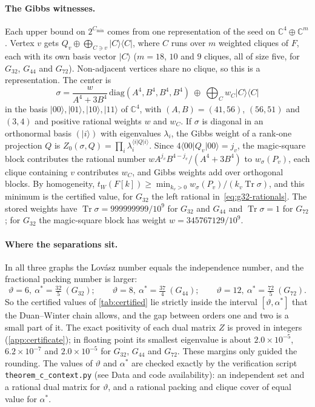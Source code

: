 \documentclass[11pt]{article}
\theoremstyle{definition}
\DeclareMathOperator{\Tr}{Tr}
\newcommand{\vt}{\vartheta}
\newcommand{\Cmin}{C_{\min}}
\newcommand{\ket}[1]{\lvert #1\rangle}
\newcommand{\bra}[1]{\langle #1\rvert}
\newcommand{\proj}[1]{\ket{#1}\!\bra{#1}}
\begin{document}
\paragraph{The Gibbs witnesses.}
Each upper bound on $2^{\Cmin}$ comes from one representation of the seed on
$\mathbb C^4\oplus\mathbb C^m$.  Vertex $v$ gets
$Q_v\oplus\bigoplus_{C\ni v}\proj C$, where $C$ runs over $m$ weighted
cliques of $F$, each with its own basis vector $\ket C$ ($m=18$, $10$ and $9$
cliques, all of size five, for $G_{32}$, $G_{44}$ and $G_{72}$).
Non-adjacent vertices share no clique, so this is a representation.  The
center is
\[
 \sigma=\frac{w}{A^4+3B^4}\,\mathrm{diag}(A^4,B^4,B^4,B^4)\ \oplus\
 \bigoplus_Cw_C\proj C
\]
in the basis $\ket{00},\ket{01},\ket{10},\ket{11}$ of $\mathbb C^4$, with
$(A,B)=(41,56)$, $(56,51)$ and $(3,4)$ and positive rational weights $w$ and
$w_C$.  If $\sigma$ is diagonal in an orthonormal basis $(\ket i)$ with
eigenvalues $\lambda_i$, the Gibbs weight of a rank-one projection $Q$ is
$Z_0(\sigma,Q)=\prod_i\lambda_i^{\bra iQ\ket i}$.  Since
$4\bra{00}Q_v\ket{00}=j_v$, the magic-square block contributes the rational
number $wA^{j_v}B^{4-j_v}/(A^4+3B^4)$ to $w_\sigma(P_v)$, each clique
containing $v$ contributes $w_C$, and Gibbs weights add over orthogonal
blocks.  By homogeneity,
$t_W(F[k])\ge\min_{k_v>0}w_\sigma(P_v)/(k_v\Tr\sigma)$, and this minimum is
the certified value, for $G_{32}$ the left rational
in~\eqref{eq:g32-rationals}.  The stored weights have $\Tr\sigma=999999999/10^9$ for
$G_{32}$ and $G_{44}$ and $\Tr\sigma=1$ for $G_{72}$; for $G_{32}$ the
magic-square block has weight $w=345767129/10^9$.

\paragraph{Where the separations sit.}  In all three graphs the Lov\'asz number
equals the independence number, and the fractional packing number is larger:
\[
 \vt=6,\ \alpha^*=\tfrac{32}5\ (G_{32});\qquad
 \vt=8,\ \alpha^*=\tfrac{37}4\ (G_{44});\qquad
 \vt=12,\ \alpha^*=\tfrac{72}5\ (G_{72}).
\]
So the certified values of \cref{tab:certified} lie strictly inside the
interval $[\vt,\alpha^*]$ that the Duan--Winter chain allows, and the gap
between orders one and two is a small part of it.  The exact positivity of
each dual matrix $Z$ is proved in integers (\cref{app:certificate}); in
floating point its smallest eigenvalue is about $2.0\times10^{-5}$,
$6.2\times10^{-7}$ and $2.0\times10^{-5}$ for $G_{32}$, $G_{44}$ and $G_{72}$.
These margins only guided the rounding.  The values of $\vt$ and $\alpha^*$
are checked exactly by the verification script
\texttt{theorem\_c\_context.py} (see Data and code availability): an
independent set and a rational dual matrix for $\vt$, and a rational packing
and clique cover of equal value for $\alpha^*$.
\end{document}
